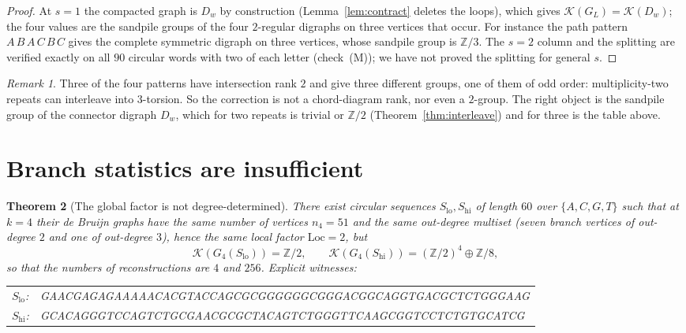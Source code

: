\documentclass[11pt]{article}
\theoremstyle{plain}
\newtheorem{theorem}{Theorem}
\theoremstyle{definition}
\theoremstyle{remark}
\newtheorem{remark}[theorem]{Remark}
\newcommand{\Z}{\mathbb{Z}}
\newcommand{\K}{\mathcal{K}}
\newcommand{\Loc}{\mathrm{Loc}}
\begin{document}
\begin{proof}
At $s=1$ the compacted graph is $D_w$ by construction (Lemma~\ref{lem:contract} deletes
the loops), which gives $\K(G_L)=\K(D_w)$; the four values are the sandpile groups of the
four $2$-regular digraphs on three vertices that occur. For instance the path pattern
$A\,B\,A\,C\,B\,C$ gives the complete symmetric digraph on three vertices, whose sandpile
group is $\Z/3$. The $s=2$ column and the splitting are verified exactly on all $90$
circular words with two of each letter (check~(M)); we have not proved the splitting for
general $s$.
\end{proof}

\begin{remark}\label{rem:notrank}
Three of the four patterns have intersection rank $2$ and give three different groups,
one of them of odd order: multiplicity-two repeats can interleave into $3$-torsion. So the
correction is not a chord-diagram rank, nor even a $2$-group. The right object is the
sandpile group of the connector digraph $D_w$, which for two repeats is trivial or $\Z/2$
(Theorem~\ref{thm:interleave}) and for three is the table above.
\end{remark}

\section{Branch statistics are insufficient}\label{sec:notdeg}

\begin{theorem}[The global factor is not degree-determined]\label{thm:notdeg}
There exist circular sequences $S_{\mathrm{lo}},S_{\mathrm{hi}}$ of length $60$ over
$\{A,C,G,T\}$ such that at $k=4$ their de Bruijn graphs have the same number of vertices
$n_4=51$ and the same out-degree multiset (seven branch vertices of out-degree $2$ and one
of out-degree $3$), hence the same local factor $\Loc=2$, but
\[
\K(G_4(S_{\mathrm{lo}}))=\Z/2,\qquad
\K(G_4(S_{\mathrm{hi}}))=(\Z/2)^{4}\oplus\Z/8 ,
\]
so that the numbers of reconstructions are $4$ and $256$. Explicit witnesses:
\begin{center}\ttfamily\small
\begin{tabular}{ll}
$S_{\mathrm{lo}}$: & GAACGAGAGAAAAACACGTACCAGCGCGGGGGGCGGGACGGCAGGTGACGCTCTGGGAAG\\
$S_{\mathrm{hi}}$: & GCACAGGGTCCAGTCTGCGAACGCGCTACAGTCTGGGTTCAAGCGGTCCTCTGTGCATCG\\
\end{tabular}
\end{center}
\end{theorem}
\end{document}
